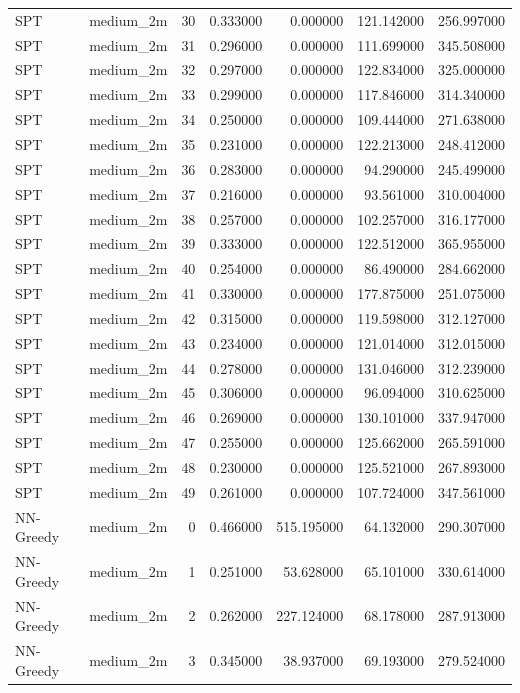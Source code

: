 \begin{tabular}{llrrrrr}
SPT & medium_2m & 30 & 0.333000 & 0.000000 & 121.142000 & 256.997000 \\
SPT & medium_2m & 31 & 0.296000 & 0.000000 & 111.699000 & 345.508000 \\
SPT & medium_2m & 32 & 0.297000 & 0.000000 & 122.834000 & 325.000000 \\
SPT & medium_2m & 33 & 0.299000 & 0.000000 & 117.846000 & 314.340000 \\
SPT & medium_2m & 34 & 0.250000 & 0.000000 & 109.444000 & 271.638000 \\
SPT & medium_2m & 35 & 0.231000 & 0.000000 & 122.213000 & 248.412000 \\
SPT & medium_2m & 36 & 0.283000 & 0.000000 & 94.290000 & 245.499000 \\
SPT & medium_2m & 37 & 0.216000 & 0.000000 & 93.561000 & 310.004000 \\
SPT & medium_2m & 38 & 0.257000 & 0.000000 & 102.257000 & 316.177000 \\
SPT & medium_2m & 39 & 0.333000 & 0.000000 & 122.512000 & 365.955000 \\
SPT & medium_2m & 40 & 0.254000 & 0.000000 & 86.490000 & 284.662000 \\
SPT & medium_2m & 41 & 0.330000 & 0.000000 & 177.875000 & 251.075000 \\
SPT & medium_2m & 42 & 0.315000 & 0.000000 & 119.598000 & 312.127000 \\
SPT & medium_2m & 43 & 0.234000 & 0.000000 & 121.014000 & 312.015000 \\
SPT & medium_2m & 44 & 0.278000 & 0.000000 & 131.046000 & 312.239000 \\
SPT & medium_2m & 45 & 0.306000 & 0.000000 & 96.094000 & 310.625000 \\
SPT & medium_2m & 46 & 0.269000 & 0.000000 & 130.101000 & 337.947000 \\
SPT & medium_2m & 47 & 0.255000 & 0.000000 & 125.662000 & 265.591000 \\
SPT & medium_2m & 48 & 0.230000 & 0.000000 & 125.521000 & 267.893000 \\
SPT & medium_2m & 49 & 0.261000 & 0.000000 & 107.724000 & 347.561000 \\
NN-Greedy & medium_2m & 0 & 0.466000 & 515.195000 & 64.132000 & 290.307000 \\
NN-Greedy & medium_2m & 1 & 0.251000 & 53.628000 & 65.101000 & 330.614000 \\
NN-Greedy & medium_2m & 2 & 0.262000 & 227.124000 & 68.178000 & 287.913000 \\
NN-Greedy & medium_2m & 3 & 0.345000 & 38.937000 & 69.193000 & 279.524000 \\

\end{tabular}
